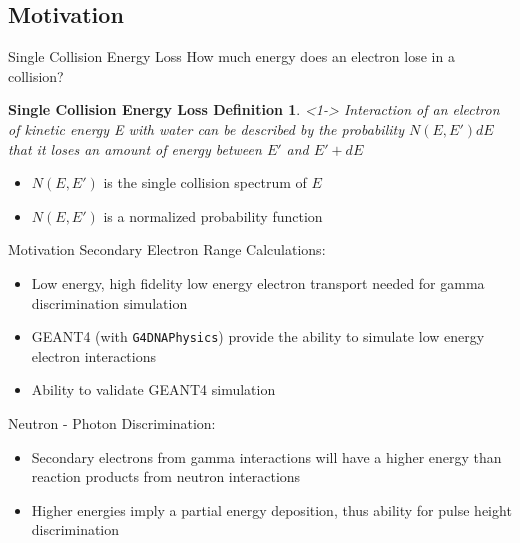 \documentclass[compress]{beamer}
\begin{document}
\subsection{Motivation}
\begin{frame}{Single Collision Energy Loss}
How much energy does an electron lose in a collision?
  \newtheorem{thm1}{Single Collision Energy Loss Definition}
  \begin{thm1}<1->
    \small
    Interaction of an electron of kinetic energy E with water can be described by the probability $N(E,E')dE$ that it loses an amount of energy between $E'$ and $E'+dE$
  \end{thm1}
  \begin{itemize}
    \item $N(E,E')$ is the single collision spectrum of $E$
    \item $N(E,E')$ is a normalized probability function
  \end{itemize}
\end{frame}
\begin{frame}[fragile]{Motivation}
  Secondary Electron Range Calculations:
  \begin{itemize}
    \item Low energy, high fidelity low energy electron transport needed for gamma discrimination simulation
    \item GEANT4 (with \verb+G4DNAPhysics+) provide the ability to simulate low energy electron interactions
    \item Ability to validate GEANT4 simulation
  \end{itemize}
  Neutron - Photon Discrimination:
  \begin{itemize}
    \item Secondary electrons from gamma interactions will have a higher energy than reaction products from neutron interactions
    \item Higher energies imply a partial energy deposition, thus ability for pulse height discrimination
  \end{itemize}
\end{frame}
\end{document}
